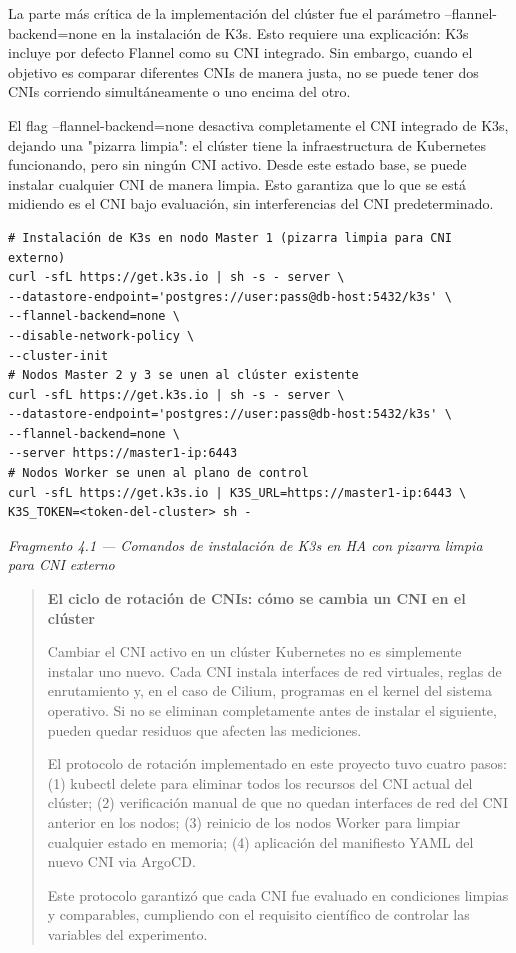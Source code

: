\documentclass[journal]{IEEEtran}
\begin{document}
La parte más crítica de la implementación del clúster fue el parámetro --flannel-backend=none en la instalación de K3s. Esto requiere una explicación: K3s incluye por defecto Flannel como su CNI integrado. Sin embargo, cuando el objetivo es comparar diferentes CNIs de manera justa, no se puede tener dos CNIs corriendo simultáneamente o uno encima del otro.

El flag --flannel-backend=none desactiva completamente el CNI integrado de K3s, dejando una "pizarra limpia": el clúster tiene la infraestructura de Kubernetes funcionando, pero sin ningún CNI activo. Desde este estado base, se puede instalar cualquier CNI de manera limpia. Esto garantiza que lo que se está midiendo es el CNI bajo evaluación, sin interferencias del CNI predeterminado.

\begin{lstlisting}[basicstyle=\ttfamily\scriptsize,breaklines=true]
# Instalación de K3s en nodo Master 1 (pizarra limpia para CNI externo)
curl -sfL https://get.k3s.io | sh -s - server \
--datastore-endpoint='postgres://user:pass@db-host:5432/k3s' \
--flannel-backend=none \
--disable-network-policy \
--cluster-init
# Nodos Master 2 y 3 se unen al clúster existente
curl -sfL https://get.k3s.io | sh -s - server \
--datastore-endpoint='postgres://user:pass@db-host:5432/k3s' \
--flannel-backend=none \
--server https://master1-ip:6443
# Nodos Worker se unen al plano de control
curl -sfL https://get.k3s.io | K3S_URL=https://master1-ip:6443 \
K3S_TOKEN=<token-del-cluster> sh -
\end{lstlisting}

\begin{center}\emph{\emph{Fragmento 4.1 --- Comandos de instalación de K3s en HA con pizarra limpia para CNI externo}}\end{center}

\begin{quote}
\textbf{El ciclo de rotación de CNIs: cómo se cambia un CNI en el clúster}

Cambiar el CNI activo en un clúster Kubernetes no es simplemente instalar uno nuevo. Cada CNI instala interfaces de red virtuales, reglas de enrutamiento y, en el caso de Cilium, programas en el kernel del sistema operativo. Si no se eliminan completamente antes de instalar el siguiente, pueden quedar residuos que afecten las mediciones.

El protocolo de rotación implementado en este proyecto tuvo cuatro pasos: (1) kubectl delete para eliminar todos los recursos del CNI actual del clúster; (2) verificación manual de que no quedan interfaces de red del CNI anterior en los nodos; (3) reinicio de los nodos Worker para limpiar cualquier estado en memoria; (4) aplicación del manifiesto YAML del nuevo CNI via ArgoCD.

Este protocolo garantizó que cada CNI fue evaluado en condiciones limpias y comparables, cumpliendo con el requisito científico de controlar las variables del experimento.
\end{quote}
\end{document}
